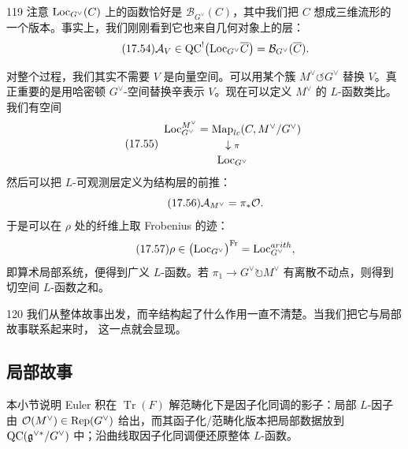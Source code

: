 \begin{srcrem}{119}
注意 $\mathrm{Loc}_{G^{\vee}}(C)$ 上的函数恰好是 $\mathcal B_{G^{\vee}}(C)$，其中我们把 $C$ 想成三维流形的
一个版本。事实上，我们刚刚看到它也来自几何对象上的层：
\begin{equation}\tag{17.54}\label{eq:17.54}
\mathcal{A}_V\in\mathrm{QC}^{!}\bigl(\mathrm{Loc}_{G^{\vee}}\overline C\bigr)
=\mathcal B_{G^{\vee}}(\overline C).
\end{equation}
\end{srcrem}

对整个过程，我们其实不需要 $V$ 是向量空间。可以用某个簇 $M^{\vee}\circlearrowleft G^{\vee}$
替换 $V$。真正重要的是用哈密顿 $G^{\vee}$-空间替换辛表示 $V$。现在可以定义 $M^{\vee}$ 的
$L$-函数类比。我们有空间
\begin{equation}\tag{17.55}\label{eq:17.55}
\begin{array}{c}
\mathrm{Loc}^{M^{\vee}}_{G^{\vee}}=\operatorname{Map}_{lc}(C,M^{\vee}/G^{\vee})\\[2pt]
\downarrow{\scriptstyle \pi}\\[2pt]
\mathrm{Loc}_{G^{\vee}}
\end{array}
\end{equation}
然后可以把 $L$-可观测层定义为结构层的前推：
\begin{equation}\tag{17.56}\label{eq:17.56}
\mathcal{A}_{M^{\vee}}=\pi_*\mathcal{O}.
\end{equation}
于是可以在 $\rho$ 处的纤维上取 Frobenius 的迹：
\begin{equation}\tag{17.57}\label{eq:17.57}
\rho\in\bigl(\mathrm{Loc}_{G^{\vee}}\bigr)^{\mathrm{Fr}}=\mathrm{Loc}^{arith}_{G^{\vee}},
\end{equation}
即算术局部系统，便得到广义 $L$-函数。若 $\pi_1\to G^{\vee}\circlearrowright M^{\vee}$
有离散不动点，则得到切空间 $L$-函数之和。

\begin{srcrem}{120}
我们从整体故事出发，而辛结构起了什么作用一直不清楚。当我们把它与局部故事联系起来时，
这一点就会显现。
\end{srcrem}

\subsection{局部故事}

\begin{sectionkey}
本小节说明 Euler 积在 $\operatorname{Tr}(F)$ 解范畴化下是因子化同调的影子：局部 $L$-因子由
$\mathcal{O}(M^{\vee})\in\mathrm{Rep}(G^{\vee})$ 给出，而其函子化/范畴化版本把局部数据放到
$\mathrm{QC}(\mathfrak g^{\vee*}/G^{\vee})$ 中；沿曲线取因子化同调便还原整体 $L$-函数。
\end{sectionkey}

